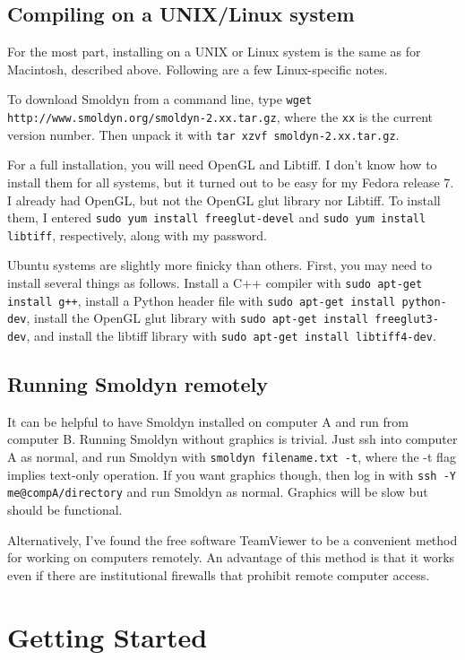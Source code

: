 \documentclass {scrbook}
\newcommand {\ttt} {\texttt}
\begin{document}
\subsection*{Compiling on a UNIX/Linux system}
For the most part, installing on a UNIX or Linux system is the same as for Macintosh, described above. Following are a few Linux-specific notes.

To download Smoldyn from a command line, type \ttt{wget http://www.smoldyn.org/smoldyn-2.xx.tar.gz}, where the \ttt{xx} is the current version number. Then unpack it with \ttt{tar xzvf smoldyn-2.xx.tar.gz}.

For a full installation, you will need OpenGL and Libtiff. I don't know how to install them for all systems, but it turned out to be easy for my Fedora release 7. I already had OpenGL, but not the OpenGL glut library nor Libtiff. To install them, I entered \ttt{sudo yum install freeglut-devel} and \ttt{sudo yum install libtiff}, respectively, along with my password.

Ubuntu systems are slightly more finicky than others. First, you may need to install several things as follows. Install a C++ compiler with \ttt{sudo apt-get install g++}, install a Python header file with \ttt{sudo apt-get install python-dev}, install the OpenGL glut library with \ttt{sudo apt-get install freeglut3-dev}, and install the libtiff library with \ttt{sudo apt-get install libtiff4-dev}.

\subsection*{Running Smoldyn remotely}
It can be helpful to have Smoldyn installed on computer A and run from computer B. Running Smoldyn without graphics is trivial. Just ssh into computer A as normal, and run Smoldyn with \ttt{smoldyn filename.txt -t}, where the -t flag implies text-only operation. If you want graphics though, then log in with \ttt{ssh -Y me@compA/directory} and run Smoldyn as normal. Graphics will be slow but should be functional.

Alternatively, I've found the free software TeamViewer to be a convenient method for working on computers remotely. An advantage of this method is that it works even if there are institutional firewalls that prohibit remote computer access.



\section{Getting Started}
\end{document}
